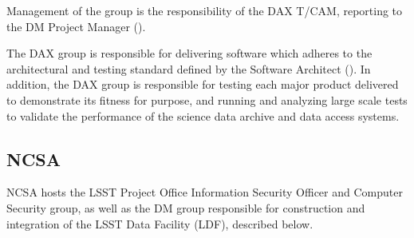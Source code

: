 Management of the group is the responsibility of the DAX T/CAM, reporting to the DM Project Manager
().

The DAX group is responsible for delivering software which adheres to the architectural and testing standard
defined by the Software Architect (). In addition, the DAX group is responsible for
testing each major product delivered to demonstrate its fitness for purpose, and running and analyzing large
scale tests to validate the performance of the science data archive and data access systems.

\subsection {NCSA\label{sect:ncsa}}


NCSA hosts the LSST Project Office Information Security Officer and Computer Security group, as well as the DM group responsible for construction and integration of the LSST Data Facility (LDF), described below.

